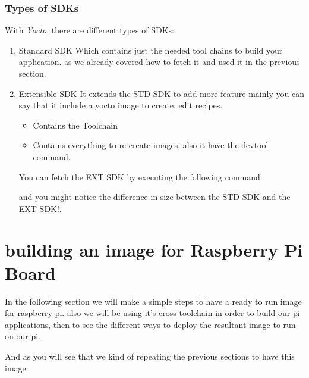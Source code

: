 \documentclass{article}
\begin{document}
\begin{enumerate}
\begin{enumerate}
  \end{enumerate}

  \subsubsection{Types of SDKs}
  With \textit{Yocto}, there are different types of SDKs:
  \begin{enumerate}
      \item Standard SDK
        Which contains just the needed tool chains to build your application. as we already covered how to fetch it and used it in the previous section.

      \item Extensible SDK
      It extends the STD SDK to add more feature mainly you can say that it include a yocto image to create, edit recipes.
      \begin{itemize}
        \item Contains the Toolchain
        \item Contains everything to re-create images, also it have the devtool command.
      \end{itemize}
      
        You can fetch the EXT SDK by executing the following command:
        

        and you might notice the difference in size between the STD SDK and the EXT SDK!.
        
  \end{enumerate}

\end{enumerate}


\section{building an image for Raspberry Pi Board}
In the following section we will make a simple steps to have a ready to run image for raspberry pi. also we will be using it's cross-toolchain in order to build our pi applications, then to see the different ways to deploy the resultant image to run on our pi.

And as you will see that we kind of repeating the previous sections to have this image. 
\end{document}
